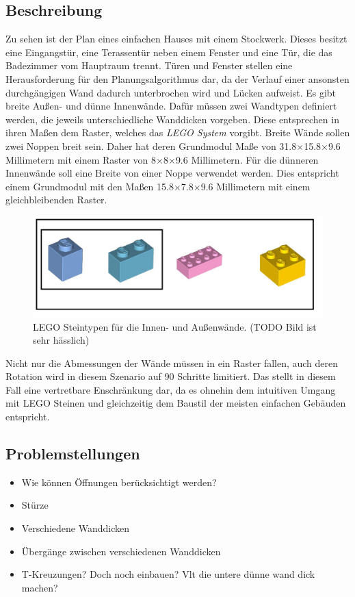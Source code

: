 \subsection*{Beschreibung}
Zu sehen ist der Plan eines einfachen Hauses mit einem Stockwerk.
Dieses besitzt eine Eingangstür, eine Terassentür neben einem Fenster und eine Tür, die das Badezimmer vom Hauptraum trennt.
Türen und Fenster stellen eine Herausforderung für den Planungsalgorithmus dar, da der Verlauf einer ansonsten durchgängigen Wand dadurch unterbrochen wird und Lücken aufweist.
Es gibt breite Außen- und dünne Innenwände.
Dafür müssen zwei Wandtypen definiert werden, die jeweils unterschiedliche Wanddicken vorgeben.
Diese entsprechen in ihren Maßen dem Raster, welches das \textit{LEGO System} vorgibt.
Breite Wände sollen zwei Noppen breit sein.
Daher hat deren Grundmodul Maße von 31.8$\times$15.8$\times$9.6 Millimetern mit einem Raster von 8$\times$8$\times$9.6 Millimetern.
Für die dünneren Innenwände soll eine Breite von einer Noppe verwendet werden.
Dies entspricht einem Grundmodul mit den Maßen 15.8$\times$7.8$\times$9.6 Millimetern mit einem gleichbleibenden Raster.
\begin{figure}[!ht]
  \centering
  \includegraphics[width=0.6\columnwidth]{fig/scenario1_lego_set.png}
  \caption{LEGO Steintypen für die Innen- und Außenwände. (TODO Bild ist sehr hässlich)}
  \label{fig:Scenario1 Lego Set}
\end{figure}
Nicht nur die Abmessungen der Wände müssen in ein Raster fallen, auch deren Rotation wird in diesem Szenario auf 90\textdegree{} Schritte limitiert. 
Das stellt in diesem Fall eine vertretbare Enschränkung dar, da es ohnehin dem intuitiven Umgang mit LEGO Steinen und gleichzeitig dem Baustil der meisten einfachen Gebäuden entspricht.

\subsection*{Problemstellungen}
\begin{itemize}
  \item Wie können Öffnungen berücksichtigt werden?
  \item Stürze
  \item Verschiedene Wanddicken
  \item Übergänge zwischen verschiedenen Wanddicken
  \item T-Kreuzungen? Doch noch einbauen? Vlt die untere dünne wand dick machen?
\end{itemize}

